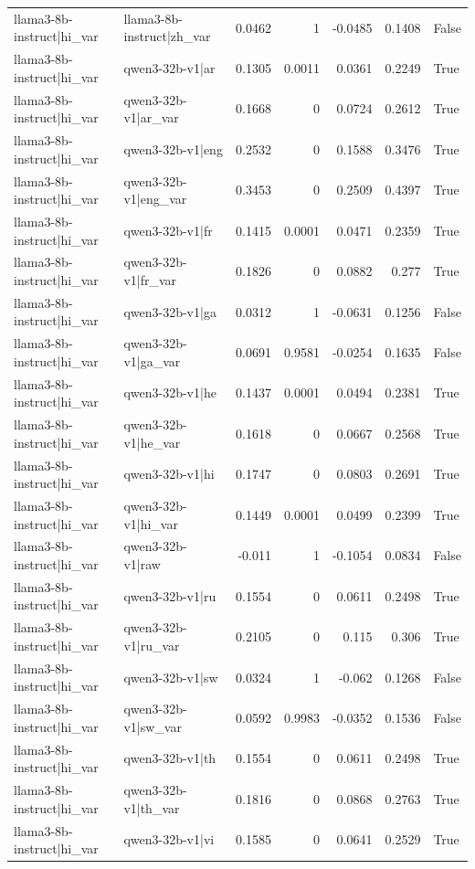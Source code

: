 \begin{table}
\begin{tabular}{l l r r r r l}
llama3-8b-instruct|hi_var & llama3-8b-instruct|zh_var & 0.0462 & 1 & -0.0485 & 0.1408 & False \\
llama3-8b-instruct|hi_var & qwen3-32b-v1|ar & 0.1305 & 0.0011 & 0.0361 & 0.2249 & True \\
llama3-8b-instruct|hi_var & qwen3-32b-v1|ar_var & 0.1668 & 0 & 0.0724 & 0.2612 & True \\
llama3-8b-instruct|hi_var & qwen3-32b-v1|eng & 0.2532 & 0 & 0.1588 & 0.3476 & True \\
llama3-8b-instruct|hi_var & qwen3-32b-v1|eng_var & 0.3453 & 0 & 0.2509 & 0.4397 & True \\
llama3-8b-instruct|hi_var & qwen3-32b-v1|fr & 0.1415 & 0.0001 & 0.0471 & 0.2359 & True \\
llama3-8b-instruct|hi_var & qwen3-32b-v1|fr_var & 0.1826 & 0 & 0.0882 & 0.277 & True \\
llama3-8b-instruct|hi_var & qwen3-32b-v1|ga & 0.0312 & 1 & -0.0631 & 0.1256 & False \\
llama3-8b-instruct|hi_var & qwen3-32b-v1|ga_var & 0.0691 & 0.9581 & -0.0254 & 0.1635 & False \\
llama3-8b-instruct|hi_var & qwen3-32b-v1|he & 0.1437 & 0.0001 & 0.0494 & 0.2381 & True \\
llama3-8b-instruct|hi_var & qwen3-32b-v1|he_var & 0.1618 & 0 & 0.0667 & 0.2568 & True \\
llama3-8b-instruct|hi_var & qwen3-32b-v1|hi & 0.1747 & 0 & 0.0803 & 0.2691 & True \\
llama3-8b-instruct|hi_var & qwen3-32b-v1|hi_var & 0.1449 & 0.0001 & 0.0499 & 0.2399 & True \\
llama3-8b-instruct|hi_var & qwen3-32b-v1|raw & -0.011 & 1 & -0.1054 & 0.0834 & False \\
llama3-8b-instruct|hi_var & qwen3-32b-v1|ru & 0.1554 & 0 & 0.0611 & 0.2498 & True \\
llama3-8b-instruct|hi_var & qwen3-32b-v1|ru_var & 0.2105 & 0 & 0.115 & 0.306 & True \\
llama3-8b-instruct|hi_var & qwen3-32b-v1|sw & 0.0324 & 1 & -0.062 & 0.1268 & False \\
llama3-8b-instruct|hi_var & qwen3-32b-v1|sw_var & 0.0592 & 0.9983 & -0.0352 & 0.1536 & False \\
llama3-8b-instruct|hi_var & qwen3-32b-v1|th & 0.1554 & 0 & 0.0611 & 0.2498 & True \\
llama3-8b-instruct|hi_var & qwen3-32b-v1|th_var & 0.1816 & 0 & 0.0868 & 0.2763 & True \\
llama3-8b-instruct|hi_var & qwen3-32b-v1|vi & 0.1585 & 0 & 0.0641 & 0.2529 & True \\

\end{tabular}
\end{table}

